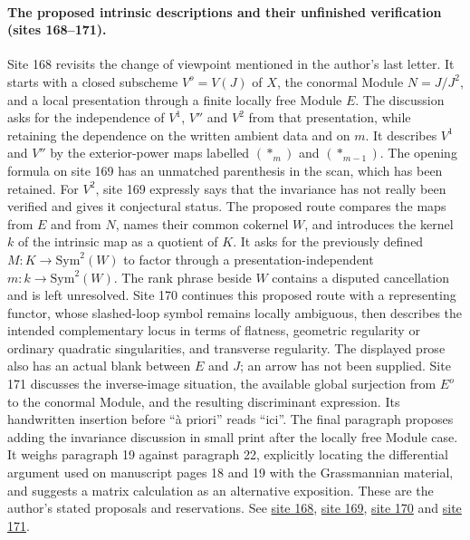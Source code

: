 \documentclass[10pt,a4paper]{article}
\begin{document}
\paragraph{The proposed intrinsic descriptions and their unfinished verification (sites 168--171).}
Site 168 revisits the change of viewpoint mentioned in the author's last letter. It starts with a closed subscheme $V^o=V(J)$ of $X$, the conormal Module $N=J/J^2$, and a local presentation through a finite locally free Module $E$. The discussion asks for the independence of $V^1$, $V''$ and $V^2$ from that presentation, while retaining the dependence on the written ambient data and on $m$. It describes $V^1$ and $V''$ by the exterior-power maps labelled $(*_m)$ and $(*_{m-1})$. The opening formula on site 169 has an unmatched parenthesis in the scan, which has been retained. For $V^2$, site 169 expressly says that the invariance has not really been verified and gives it conjectural status. The proposed route compares the maps from $E$ and from $N$, names their common cokernel $W$, and introduces the kernel $k$ of the intrinsic map as a quotient of $K$. It asks for the previously defined $M:K\to\mathrm{Sym}^2(W)$ to factor through a presentation-independent $m:k\to\mathrm{Sym}^2(W)$. The rank phrase beside $W$ contains a disputed cancellation and is left unresolved. Site 170 continues this proposed route with a representing functor, whose slashed-loop symbol remains locally ambiguous, then describes the intended complementary locus in terms of flatness, geometric regularity or ordinary quadratic singularities, and transverse regularity. The displayed prose also has an actual blank between $E$ and $J$; an arrow has not been supplied. Site 171 discusses the inverse-image situation, the available global surjection from $E^o$ to the conormal Module, and the resulting discriminant expression. Its handwritten insertion before ``à priori'' reads ``ici''. The final paragraph proposes adding the invariance discussion in small print after the locally free Module case. It weighs paragraph 19 against paragraph 22, explicitly locating the differential argument used on manuscript pages 18 and 19 with the Grassmannian material, and suggests a matrix calculation as an alternative exposition. These are the author's stated proposals and reservations. See \href{https://grothendieck.umontpellier.fr/web/viewer.html?file=../25.pdf#page=169}{site 168}, \href{https://grothendieck.umontpellier.fr/web/viewer.html?file=../25.pdf#page=170}{site 169}, \href{https://grothendieck.umontpellier.fr/web/viewer.html?file=../25.pdf#page=171}{site 170} and \href{https://grothendieck.umontpellier.fr/web/viewer.html?file=../25.pdf#page=172}{site 171}.
\par{}
\end{document}
